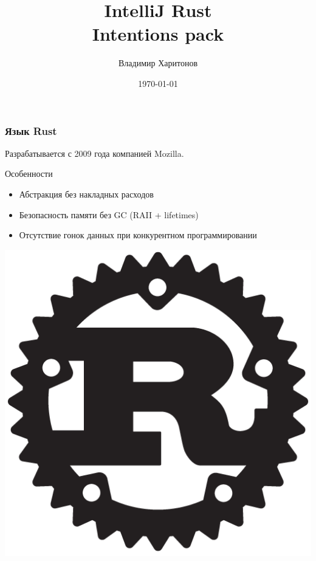 \documentclass[10pt,pdf,hyperref={unicode}]{beamer}
\title[IntelliJ Rust Intentions pack]{IntelliJ Rust \\ Intentions pack}
\institute[]{ Computer Science Center \\
	Руководитель: Алексей Кладов
}
\author{Владимир Харитонов}
\date{\today}
\begin{document}
\begin{frame}
\titlepage
\end{frame} 

\begin{frame}
\frametitle{Язык Rust} 
	Разрабатывается с 2009 года компанией Mozilla.

    \begin{block}{Особенности}
        \begin{itemize}
            \item Абстракция без накладных расходов 
            \item Безопасность памяти без GC (RAII + lifetimes)
            \item Отсутствие гонок данных при конкурентном программировании
        \end{itemize}
    \end{block}
    \vfill
    {
        \centering
	    \includegraphics[scale = 0.2]{rust-logo-512x512-blk.png} \\
    }
\end{frame}
\end{document}
